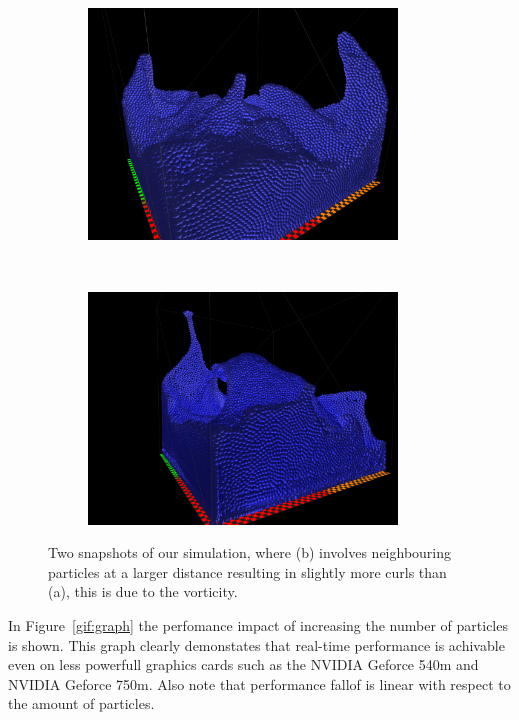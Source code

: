 \begin{figure}[H]
\centering
\begin{subfigure}{.9\textwidth}
  \centering
  \includegraphics[width=0.9\textwidth]{img/55296_edit.png}
  \caption{}
\end{subfigure}%
\\
\begin{subfigure}{.9\textwidth}
  \centering
  \includegraphics[width=0.9\textwidth]{img/3Nieghbours_55size.png}
  \caption{}
\end{subfigure}%

\caption{Two snapshots of our simulation, where (b) involves neighbouring particles at a larger distance resulting in slightly more curls than (a), this is due to the vorticity.}
\label{fig:result}
\end{figure}

In Figure~\ref{gif:graph} the perfomance impact of increasing the number of
particles is shown. This graph clearly demonstates that real-time performance
is achivable even on less powerfull graphics cards such as the NVIDIA Geforce
540m and NVIDIA Geforce 750m. Also note that performance fallof is linear with
respect to the amount of particles.

